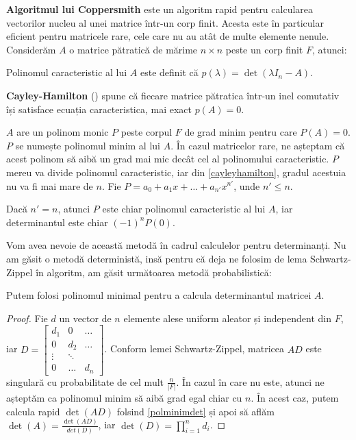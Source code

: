 \textbf{Algoritmul lui Coppersmith} \cite{wiedemann} este un algoritm rapid pentru calcularea
vectorilor nucleu al unei matrice într-un corp finit. Acesta este în particular
eficient pentru matricele rare, cele care nu au atât de multe elemente nenule. \\

Considerăm $A$ o matrice pătratică de mărime $n \times n$ peste un corp finit $F$, atunci:

\begin{defn}
  Polinomul caracteristic al lui $A$ este definit că
  $p(\lambda) = \det(\lambda I_{n} - A)$.
\end{defn}

\begin{thm}
  \label{cayleyhamilton}
  \textbf{Cayley-Hamilton} (\cite{algebrabook}) spune că fiecare matrice pătratica
  într-un inel comutativ își satisface ecuația caracteristica, mai exact $p(A) = 0$.
\end{thm}

$A$ are un polinom monic $P$ peste corpul $F$ de grad minim pentru care
$P(A) = 0$. $P$ se numește polinomul minim al lui $A$. În
cazul matricelor rare, ne așteptam că acest polinom să aibă un grad mai mic
decât cel al polinomului caracteristic. $P$ mereu va divide polinomul
caracteristic, iar din \ref{cayleyhamilton}, gradul acestuia nu va fi mai mare
de $n$. Fie $P = a_{0} + a_{1}x + \ldots + a_{n'}x^{n'}$, unde $n' \leq n$.

\begin{lem}
  \label{polminimdet}
  Dacă $n' = n$, atunci $P$ este chiar polinomul caracteristic al lui $A$, iar
  determinantul este chiar $(-1)^{n}P(0)$.
\end{lem}

Vom avea nevoie de această metodă în cadrul calculelor pentru determinanți.
Nu am găsit o metodă deterministă, insă pentru că deja ne folosim de lema
Schwartz-Zippel în algoritm, am găsit următoarea metodă probabilistică:

\begin{lem}
  Putem folosi polinomul minimal pentru a calcula determinantul matricei $A$.
\end{lem}

\begin{proof}
  Fie $d$ un vector de $n$ elemente
  alese uniform aleator și independent din $F$, iar
  $D =
  \begin{bmatrix}
    d_{1} & 0 & \dots \\
    0 & d_{2} & \dots \\
    \vdots & \ddots & \\
    0 & \dots & d_{n}
  \end{bmatrix}$. Conform lemei Schwartz-Zippel, matricea $AD$ este singulară cu
  probabilitate de cel mult $\frac{n}{|F|}$. În cazul în care nu este, atunci ne
  așteptăm ca polinomul minim să aibă grad egal chiar cu $n$. În acest caz,
  putem calcula rapid $\det(AD)$ folsind \ref{polminimdet} și apoi să aflăm
  $\det(A) = \frac{\det(AD)}{det(D)}$, iar $\det(D) = \prod_{i=1}^{n} d_{i}$.
\end{proof}

